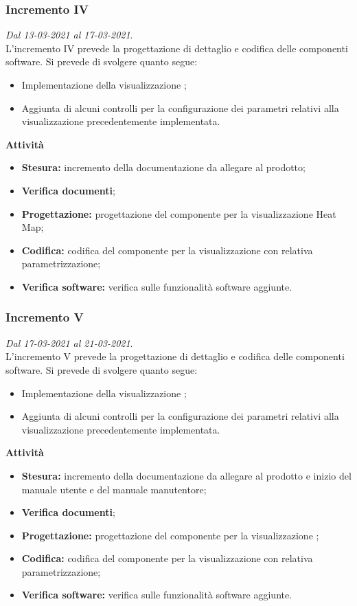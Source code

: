 \subsubsection{Incremento IV}
\textit{Dal 13-03-2021 al 17-03-2021}.\\
L'incremento IV prevede la progettazione di dettaglio e codifica delle componenti software. Si prevede di svolgere quanto segue:
\begin{itemize}
\item Implementazione della visualizzazione ;
\item Aggiunta di alcuni controlli per la configurazione dei parametri relativi alla visualizzazione precedentemente implementata.
\end{itemize}
\textbf{Attività}
\begin{itemize}
\item \textbf{Stesura:} incremento della documentazione da allegare al prodotto;
\item \textbf{Verifica documenti};
\item \textbf{Progettazione:} progettazione del componente per la visualizzazione Heat Map;
\item \textbf{Codifica:} codifica del componente per la visualizzazione con relativa parametrizzazione;
\item \textbf{Verifica software:} verifica sulle funzionalità software aggiunte.
\end{itemize}

\subsubsection{Incremento V}
\textit{Dal 17-03-2021 al 21-03-2021}.\\
L'incremento V prevede la progettazione di dettaglio e codifica delle componenti software. Si prevede di svolgere quanto segue:
\begin{itemize}
\item Implementazione della visualizzazione ;
\item Aggiunta di alcuni controlli per la configurazione dei parametri relativi alla visualizzazione precedentemente implementata.
\end{itemize}
\textbf{Attività}
\begin{itemize}
\item \textbf{Stesura:} incremento della documentazione da allegare al prodotto e inizio del manuale utente e del manuale manutentore;
\item \textbf{Verifica documenti};
\item \textbf{Progettazione:} progettazione del componente per la visualizzazione ;
\item \textbf{Codifica:} codifica del componente per la visualizzazione con relativa parametrizzazione;
\item \textbf{Verifica software:} verifica sulle funzionalità software aggiunte.
\end{itemize}

